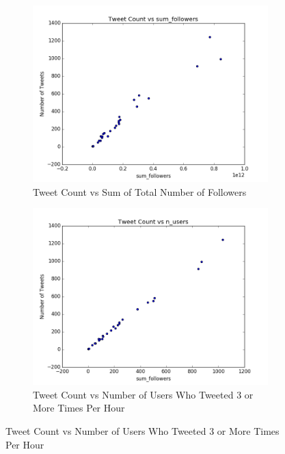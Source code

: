 \documentclass[12pt]{article}
\begin{document}
\begin{figure}[H]
\centering
\begin{subfigure}{.45\textwidth}
  \centering
\includegraphics[width=\textwidth]{figures/count_vs_sum_tweets_patriots.png}
\caption{Tweet Count vs Sum of Total Number of Followers}
\label{part1:fig:LC}
\end{subfigure}%
\hfill
\begin{subfigure}{.45\textwidth}
  \centering
\includegraphics[width=\textwidth]{figures/count_vs_n_users_tweets_patriots.png}
\caption{Tweet Count vs Number of Users Who Tweeted 3 or More Times Per Hour}
\label{part1:fig:LC}
\end{subfigure}


\end{figure}
\end{document}
